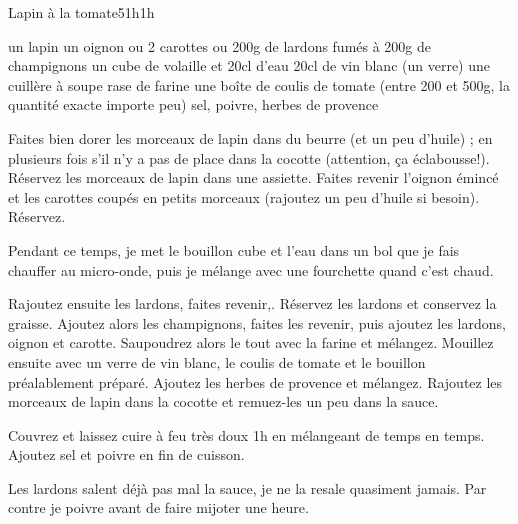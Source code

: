\begin{recette}{Lapin à la tomate}{5}{1h}{1h}
\begin{ingredients}[4 pers.]
\ingredient un lapin
\ingredient un oignon
 ou 2 carottes
 ou 200g de lardons fumés
 à 200g de champignons
\ingredient un cube de volaille et 20cl d'eau
\ingredient 20cl de vin blanc (un verre)
\ingredient une cuillère à soupe rase de farine
\ingredient une boîte de coulis de tomate (entre 200 et 500g, la quantité exacte importe peu)
\ingredient sel, poivre, herbes de provence
\end{ingredients}

\begin{preparation}
\etape Faites bien dorer les morceaux de lapin dans du beurre (et un peu d'huile) ; en plusieurs fois s'il n'y a pas de place dans la cocotte (attention, ça éclabousse!).
\etape Réservez les morceaux de lapin dans une assiette.
\etape Faites revenir l'oignon émincé et les carottes coupés en petits morceaux (rajoutez un peu d'huile si besoin). Réservez.
\begin{remarque}
Pendant ce temps, je met le bouillon cube et l'eau dans un bol que je fais chauffer au micro-onde, puis je mélange avec une fourchette quand c'est chaud.
\end{remarque}
\etape Rajoutez ensuite les lardons, faites revenir,. Réservez les lardons et conservez la graisse. 
\etape Ajoutez alors les champignons, faites les revenir, puis ajoutez les lardons, oignon et carotte.
\etape Saupoudrez alors le tout avec la farine et mélangez. 
\etape Mouillez ensuite avec un verre de vin blanc, le coulis de tomate et le bouillon préalablement préparé. Ajoutez les herbes de provence et mélangez.
\etape Rajoutez les morceaux de lapin dans la cocotte et remuez-les un peu dans la sauce.
\end{preparation}

\begin{cuisson}
Couvrez et laissez cuire à feu très doux 1h en mélangeant de temps en temps. Ajoutez sel et poivre en fin de cuisson.
\begin{remarque}
Les lardons salent déjà pas mal la sauce, je ne la resale quasiment jamais. Par contre je poivre avant de faire mijoter une heure.
\end{remarque}
\end{cuisson}
\end{recette}

